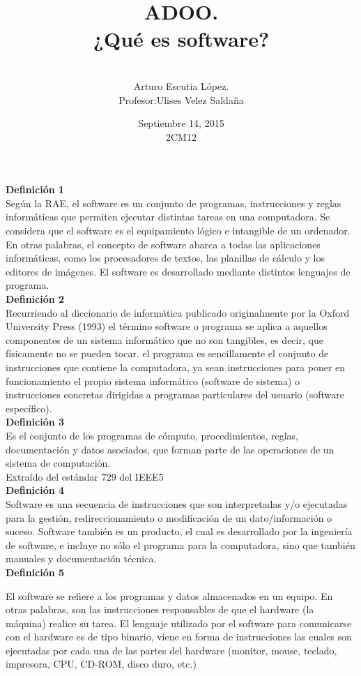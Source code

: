 \documentclass{article}
\title{\Huge ADOO.\vspace{1 cm}  \\ ¿Qué es software? \vspace{1 cm} }
\author{\\ \Huge Arturo Escutia López.\vspace{2 cm}\\ \Huge Profesor:Ulises Velez Saldaña}
\date{\Huge\vspace{2 cm}Septiembre 14, 2015 \Huge  \vspace{2 cm} \\2CM12 \vspace{4 cm}}
\begin{document}
 


\maketitle

 \LARGE  \textbf{Definición 1}\\
\large 
Según la RAE, el software es un conjunto de programas, instrucciones y reglas informáticas que permiten ejecutar distintas tareas en una computadora.
Se considera que el software es el equipamiento lógico e intangible de un ordenador. En otras palabras, el concepto de software abarca a todas las aplicaciones informáticas, como los procesadores de textos, las planillas de cálculo y los editores de imágenes.
El software es desarrollado mediante distintos lenguajes de programa.\\ 

 \LARGE  \textbf{ Definición 2 } \\
\large 
 Recurriendo al diccionario de informática publicado originalmente por la Oxford University Press (1993) el término software o programa se aplica a aquellos componentes de un sistema informático que no son tangibles, es decir, que físicamente no se pueden tocar. 
 el programa es sencillamente el conjunto de instrucciones que contiene la computadora, ya sean instrucciones para poner en funcionamiento el propio sistema informático (software de sistema) o instrucciones concretas dirigidas a programas particulares del usuario (software
específico). \\



 \LARGE  \textbf{ Definición 3 } \\
\large 
Es el conjunto de los programas de cómputo, procedimientos, reglas, documentación y datos asociados, que forman parte de las operaciones de un sistema de computación.
\\Extraído del estándar 729 del IEEE5\\


 \LARGE  \textbf{ Definición 4 }\\
\large 
Software es una secuencia de instrucciones que son interpretadas y/o ejecutadas para la gestión, redireccionamiento o modificación de un dato/información o suceso. 
Software también es un producto, el cual es desarrollado por la ingeniería de software, e incluye no sólo el programa para la computadora, sino que también manuales y documentación técnica.\\ 

\LARGE  \textbf{ Definición 5 }\\
\large 

El software se refiere a los programas y datos almacenados en un equipo. En otras palabras, son las instrucciones responsables de que el hardware (la máquina) realice su tarea.
El lenguaje utilizado por el software para comunicarse con el hardware es de tipo binario, viene en forma de instrucciones las cuales son ejecutadas por cada una de las partes del hardware (monitor, mouse, teclado, impresora, CPU, CD-ROM, disco duro, etc.)
\end{document}
